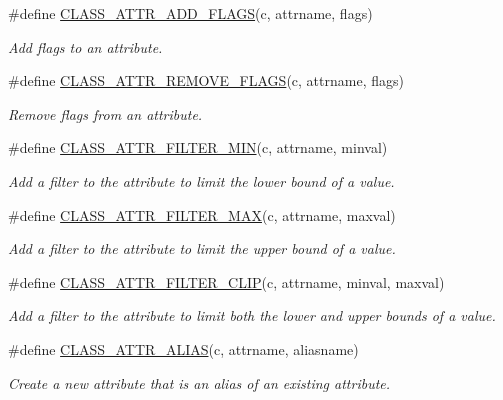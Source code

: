 \begin{DoxyCompactItemize}
\#define \hyperlink{group__attr_gaad04909fb7bf69d1fffb28b8b246e2c9}{CLASS\_\-ATTR\_\-ADD\_\-FLAGS}(c, attrname, flags)
\begin{DoxyCompactList}\small\item\em Add flags to an attribute. \item\end{DoxyCompactList}\item 
\#define \hyperlink{group__attr_gaf59e0b77e66f714f5f2644e6923685f2}{CLASS\_\-ATTR\_\-REMOVE\_\-FLAGS}(c, attrname, flags)
\begin{DoxyCompactList}\small\item\em Remove flags from an attribute. \item\end{DoxyCompactList}\item 
\#define \hyperlink{group__attr_gae7e3e18443e45adab1b5330ce2492a76}{CLASS\_\-ATTR\_\-FILTER\_\-MIN}(c, attrname, minval)
\begin{DoxyCompactList}\small\item\em Add a filter to the attribute to limit the lower bound of a value. \item\end{DoxyCompactList}\item 
\#define \hyperlink{group__attr_ga6d756455a9923aa01a16796b7d458fd9}{CLASS\_\-ATTR\_\-FILTER\_\-MAX}(c, attrname, maxval)
\begin{DoxyCompactList}\small\item\em Add a filter to the attribute to limit the upper bound of a value. \item\end{DoxyCompactList}\item 
\#define \hyperlink{group__attr_ga7a9fa82b3419df8a770830fb34df39b0}{CLASS\_\-ATTR\_\-FILTER\_\-CLIP}(c, attrname, minval, maxval)
\begin{DoxyCompactList}\small\item\em Add a filter to the attribute to limit both the lower and upper bounds of a value. \item\end{DoxyCompactList}\item 
\#define \hyperlink{group__attr_gaf3146a58bac23a009ee79550ab8be70d}{CLASS\_\-ATTR\_\-ALIAS}(c, attrname, aliasname)
\begin{DoxyCompactList}\small\item\em Create a new attribute that is an alias of an existing attribute. \item\end{DoxyCompactList}\item 

\end{DoxyCompactItemize}
